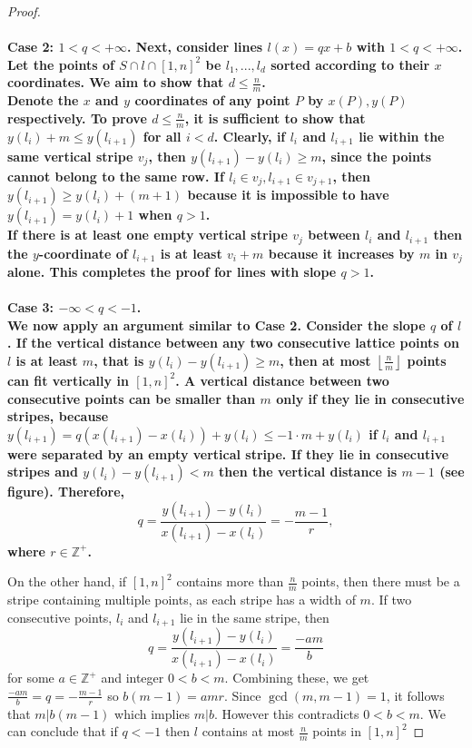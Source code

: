 \documentclass[11pt,a4paper]{article}
\numberwithin{equation}{section}
\begin{document}
\begin{proof}
\\\\
\noindent
\bf Case 2: \rm $1< q < +\infty$. Next, consider lines $l(x)=qx+b$ with $1< q < +\infty$. Let the points of $S\cap l\cap [1,n]^2$ be $l_1, ..., l_d$ sorted according to their $x$ coordinates. We aim to show that $d \le \frac{n}{m}$. \\
Denote the $x$ and $y$ coordinates of any point $P$ by $x(P), y(P)$ respectively.
To prove $d\le \frac{n}{m}$, it is sufficient to show that $y(l_i)+m\le y(l_{i+1})$ for all $i<d$. Clearly, if $l_i$ and $l_{i+1}$ lie within the same vertical stripe $v_j$, then $y(l_{i+1})-y(l_i)\ge m$, since the points cannot belong to the same row. If $l_i\in v_j, l_{i+1}\in v_{j+1}$, then $y(l_{i+1})\ge y(l_i)+(m+1)$ because it is impossible to have $y(l_{i+1})=y(l_i)+1$ when $q>1$. \\
If there is at least one empty vertical stripe $v_j$ between $l_i$ and $l_{i+1}$ then the $y$-coordinate of $l_{i+1}$ is at least $v_i+m$ because it increases by $m$ in $v_j$ alone. This completes the proof for lines with slope $q>1$.
\\\\
\noindent
\bf Case 3: \rm $-\infty < q < -1$.\\
We now apply an argument similar to Case 2. Consider the slope $q$ of $l$.
If the vertical distance between any two consecutive lattice points on $l$ is at least $m$, that is $y(l_i)-y(l_{i+1})\ge m$, then at most $\left \lfloor \frac nm \right \rfloor$ points can fit vertically in $[1,n]^2$. A vertical distance between two consecutive points can be smaller than $m$ only if they lie in consecutive stripes, because $y(l_{i+1})=q(x(l_{i+1})-x(l_i))+y(l_i)\le-1\cdot m+y(l_i)$ if $l_i$ and $l_{i+1}$ were separated by an empty vertical stripe. If they lie in consecutive stripes and $y(l_i)-y(l_{i+1})<m$ then the vertical distance is $m-1$ (see figure). Therefore, $$q=\frac{y(l_{i+1})-y(l_i)}{x(l_{i+1})-x(l_i)}=-\frac{m-1}{r},$$ where $r\in \mathbb{Z}^+$.

On the other hand, if $[1,n]^2$ contains more than $\frac{n}{m}$ points, then there must be a stripe containing multiple points, as each stripe has a width of $m$. If two consecutive points, $l_i$ and $l_{i+1}$ lie in the same stripe, then $$q=\frac{y(l_{i+1})-y(l_i)}{x(l_{i+1})-x(l_i)}=\frac{-am}{b}$$ for some $a\in \mathbb{Z}^+$ and integer $0<b<m$. Combining these, we get $\frac{-am}{b}=q=-\frac{m-1}{r}$ so $b(m-1)=amr$. Since $\gcd(m, m-1)=1$, it follows that $m|b(m-1)$ which implies $ m|b$. However this contradicts $0<b<m$. 
We can conclude that if $q<-1$ then $l$ contains at most $\frac{n}{m}$ points in $[1,n]^2$
\end{proof}
\end{document}
